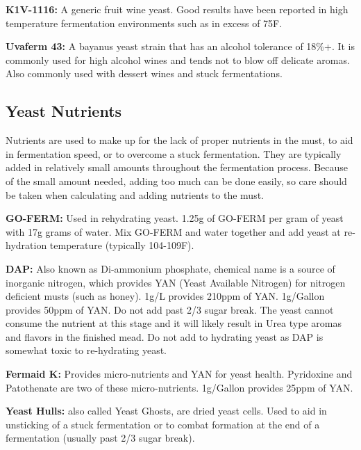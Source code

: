 \documentclass{article}
\begin{document}
  \textbf{K1V-1116:} A generic fruit wine yeast. Good results have been reported in high temperature fermentation 
   environments such as in excess of 75\textdegree F.

  \textbf{Uvaferm 43:} A bayanus yeast strain that has an alcohol tolerance of 18\%+. It is commonly used for 
   high alcohol wines and tends not to blow off delicate aromas. Also commonly used with dessert wines and stuck 
   fermentations. 

 \subsection{Yeast Nutrients}
  Nutrients are used to make up for the lack of proper nutrients in the must, to aid in fermentation speed, or 
  to overcome a stuck fermentation. They are typically added in relatively small amounts throughout the fermentation
  process. Because of the small amount needed, adding too much can be done easily, so care should be taken when 
  calculating and adding nutrients to the must.

  \textbf{GO-FERM:} Used in rehydrating yeast. 1.25g of GO-FERM per gram of yeast with 17g grams of water. 
   Mix GO-FERM and water together and add yeast at re-hydration temperature (typically 104-109F). 

  \textbf{DAP:} Also known as Di-ammonium phosphate, chemical name  is a source of inorganic 
   nitrogen, which provides YAN (Yeast Available Nitrogen) for nitrogen deficient musts (such as honey). 
   1g/L provides 210ppm of YAN. 1g/Gallon provides 50ppm of YAN.  Do not add past 2/3 sugar break. 
   The yeast cannot consume the nutrient at this stage and it will likely result in Urea type aromas and 
   flavors in the finished mead. Do not add to hydrating yeast as DAP is somewhat toxic to re-hydrating yeast.

  \textbf{Fermaid K:} Provides micro-nutrients and YAN for yeast health. Pyridoxine and Patothenate are two of 
   these micro-nutrients. 1g/Gallon provides 25ppm of YAN.


  \textbf{Yeast Hulls:} also called Yeast Ghosts, are dried yeast cells. Used to aid in unsticking of a stuck 
   fermentation or to combat  formation at the end of a fermentation (usually past 2/3 sugar break).
  
\end{document}
